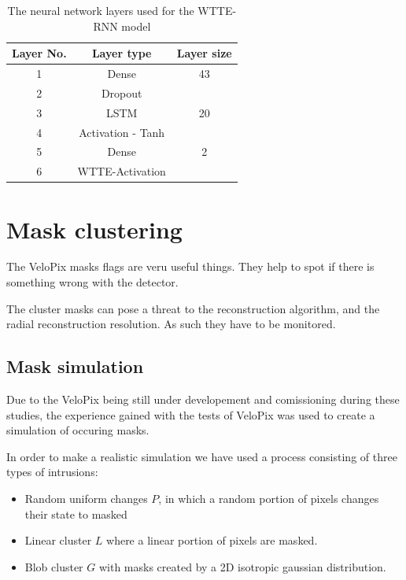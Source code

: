 \begin{table}[h]
\begin{center}
\begin{tabular}{ |c|c|c| }
\hline
Layer No. & Layer type & Layer size\\
\hline
1 & Dense & 43\\
2 & Dropout & \\
3 & LSTM & 20\\
4 & Activation - Tanh & \\
5 & Dense & 2\\
6 & WTTE-Activation & \\
\hline
\end{tabular}
\caption{\label{tab:network}The neural network layers used for the WTTE-RNN model}
\end{center}
\end{table}



\section{Mask clustering}

The VeloPix masks flags are veru useful things. They help to spot if there is something wrong with the detector.

The cluster masks can pose a threat to the reconstruction algorithm, and the radial reconstruction resolution.
As such they have to be monitored. 
\subsection{Mask simulation}

Due to the VeloPix being still under developement and comissioning during these studies, the experience gained with the tests of VeloPix was used to create a simulation of occuring masks.


In order to make a realistic simulation we have used a process consisting of three types of intrusions:

\begin{itemize}
  \item Random uniform changes $P$, in which a random portion of pixels changes their state to masked
  \item Linear cluster $L$ where a linear portion of pixels are masked.
  \item Blob cluster $G$ with masks created by a 2D isotropic gaussian distribution.
\end{itemize}

